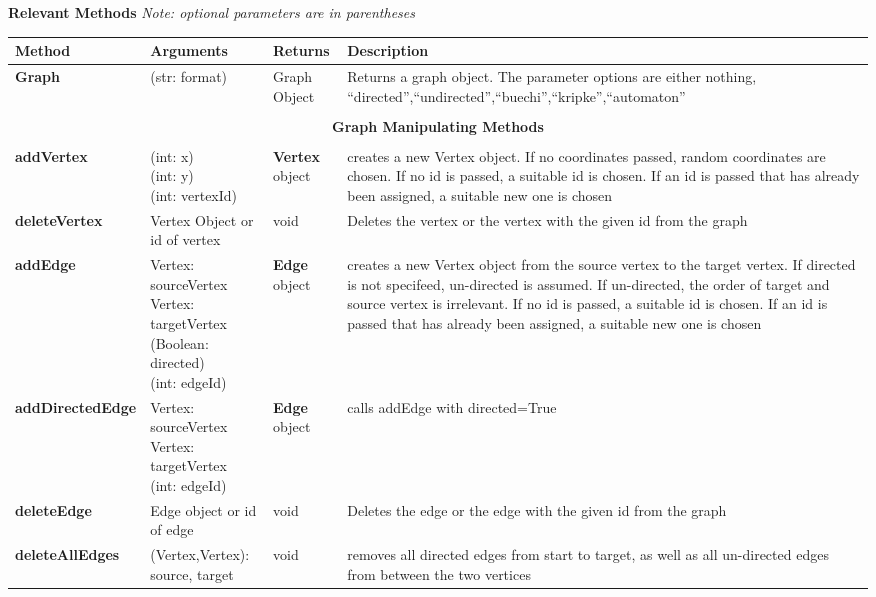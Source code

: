 \documentclass{article}
\newlength\q
\newlength\smallCol
\newlength\argsLen
\begin{document}
\textbf{{\large Relevant Methods}}
\textit{Note: optional parameters are in parentheses}


\begin{longtable}{m{\smallCol}m{\argsLen}m{\smallCol}m{\q}}
Method & Arguments & Returns & Description \\ \hline
\textbf{Graph}& (str: format) & Graph Object & Returns a graph object. The parameter options are either nothing, ``directed'',``undirected'',``buechi'',``kripke'',``automaton'' \\\hline
\\\multicolumn{4}{c}{\textbf{Graph Manipulating Methods}}\\\\\hline
\textbf{addVertex}  & \makecell{(int: x)\\(int: y)\\(int: vertexId)} & \textbf{Vertex} object & creates a new Vertex object. If no coordinates passed, random coordinates are chosen. If no id is passed, a suitable id is chosen. If an id is passed that has already been assigned, a suitable new one is chosen\\\hline
\textbf{deleteVertex} & Vertex Object or id of vertex & void & Deletes the vertex or the vertex with the given id from the graph\\ \hline
\textbf{addEdge} & \makecell{Vertex: sourceVertex\\Vertex: targetVertex\\(Boolean: directed) \\ (int: edgeId)} & \textbf{Edge} object & creates a new Vertex object from the source vertex to the target vertex. If directed is not specifeed, un-directed is assumed. If un-directed, the order of target and source vertex is irrelevant. If no id is passed, a suitable id is chosen. If an id is passed that has already been assigned, a suitable new one is chosen \\ \hline
\textbf{addDirectedEdge} & \makecell{Vertex: sourceVertex\\Vertex: targetVertex \\ (int: edgeId)} & \textbf{Edge} object & calls addEdge with directed=True \\ \hline
\textbf{deleteEdge} & Edge object or id of edge & void &  Deletes the edge or the edge with the given id from the graph\\ \hline
\textbf{deleteAllEdges} & (Vertex,Vertex): source, target & void & removes all directed edges from start to target, as well as all un-directed edges from between the two vertices \\ \hline

\end{longtable}
\end{document}
